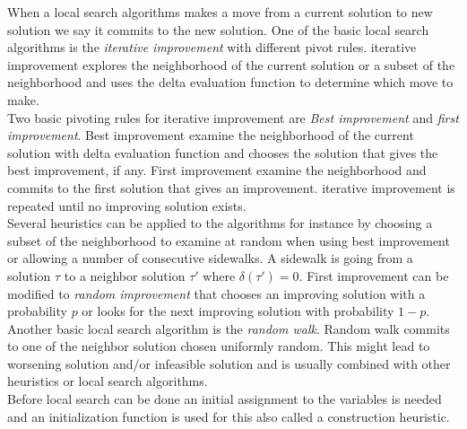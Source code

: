 When a local search algorithms makes a move from a current solution to new solution we say it commits to the new 
solution. One of the basic local search algorithms is the \emph{iterative improvement} with different pivot rules. 
iterative improvement explores the neighborhood of the current solution or a subset of the neighborhood and uses the 
delta evaluation function to determine which move to make. \\ 
Two basic pivoting rules for iterative improvement are \emph{Best improvement} and \emph{first 
improvement}. Best improvement examine the neighborhood of the current solution with delta evaluation function and 
chooses the solution that gives the best improvement, if any. First improvement examine the neighborhood and commits to 
the first solution that gives an improvement. iterative improvement is repeated until no improving solution exists. \\ 
Several heuristics can be applied to the algorithms for instance by choosing a subset of the neighborhood to examine at 
random when using best improvement or allowing a number of consecutive sidewalks. A sidewalk is going from a solution 
$\tau$ to a neighbor solution $\tau'$ where $\delta(\tau') = 0$. First improvement can be modified to \emph{random 
improvement} that chooses an improving solution with a probability $p$ or looks for the next improving solution with 
probability $1-p$. \\
Another basic local search algorithm is the \emph{random walk}. Random walk commits to one of the neighbor 
solution chosen uniformly random. This might lead to worsening solution and/or infeasible solution and is usually 
combined with other heuristics or local search algorithms. \\
Before local search can be done an initial assignment to the variables is needed and an initialization function is 
used for this also called a construction heuristic. 